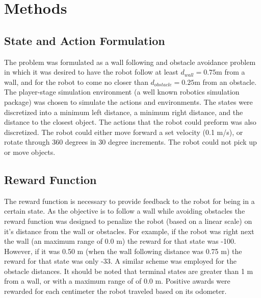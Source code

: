 \documentclass[conference]{IEEEtran}
\begin{document}
\section{Methods}
\subsection{State and Action Formulation}
The problem was formulated as a wall following and obstacle avoidance problem in which it was desired to have the robot follow at least $d_{wall} = 0.75 \text{m}$ from a wall, and for the robot to come no closer than $d_{obstacle} = 0.25 \text{m}$ from an obstacle.
The player-stage simulation environment\cite{gerkey_player_2012} (a well known robotics simulation package) was chosen to simulate the actions and environments.  The states were discretized into a minimum left distance, a minimum right distance, and the distance to the closest object.
The actions that the robot could preform was also discretized.  
The robot could either move forward a set velocity (0.1 m/s), or rotate through 360 degrees in 30 degree increments.
The robot could not pick up or move objects.
\subsection{Reward Function}
The reward function is necessary to provide feedback to the robot for being in a certain state.
As the objective is to follow a wall while avoiding obstacles the reward function was designed to penalize the robot (based on a linear scale) on it's distance from the wall or obstacles.   
For example, if the robot was right next the wall (an maximum range of 0.0 m) the reward for that state was -100.  
However, if it was 0.50 m (when the wall following distance was 0.75 m) the reward for that state was only -33.
A similar scheme was employed for the obstacle distances.
It should be noted that terminal states are greater than 1 m from a wall, or with a maximum range of of 0.0 m.
Positive awards were rewarded for each centimeter the robot traveled based on its odometer.
\end{document}
